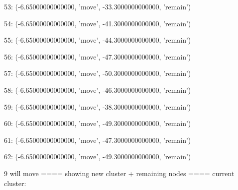 53: (-6.65000000000000, 'move', -33.3000000000000, 'remain')


54: (-6.65000000000000, 'move', -41.3000000000000, 'remain')


55: (-6.65000000000000, 'move', -44.3000000000000, 'remain')


56: (-6.65000000000000, 'move', -47.3000000000000, 'remain')


57: (-6.65000000000000, 'move', -50.3000000000000, 'remain')


58: (-6.65000000000000, 'move', -46.3000000000000, 'remain')


59: (-6.65000000000000, 'move', -38.3000000000000, 'remain')


60: (-6.65000000000000, 'move', -49.3000000000000, 'remain')


61: (-6.65000000000000, 'move', -47.3000000000000, 'remain')


62: (-6.65000000000000, 'move', -49.3000000000000, 'remain')


9 will move
==== showing new cluster + remaining nodes ====
current cluster:


